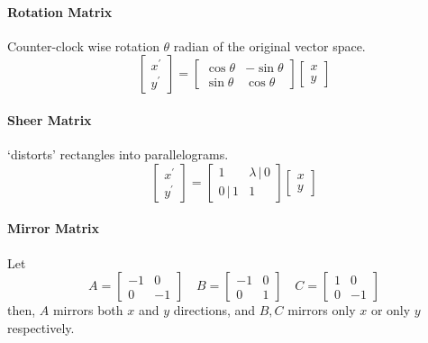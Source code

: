 \documentclass[11pt]{article}
\begin{document}
\paragraph{Rotation Matrix} Counter-clock wise rotation $\theta$ radian of the original vector space. 
\begin{equation}
	\left[\begin{array}{l}
		x^{\prime} \\
		y^{\prime}
		\end{array}\right]=\left[\begin{array}{ll}
		\cos \theta & -\sin\theta \\
		\sin\theta & \cos\theta
		\end{array}\right]\left[\begin{array}{l}
		x \\
		y
	\end{array}\right]
\end{equation}

\paragraph{Sheer Matrix} `distorts' rectangles into parallelograms. 
\begin{equation}
	\left[\begin{array}{l}
		x^{\prime} \\
		y^{\prime}
		\end{array}\right]=\left[\begin{array}{ll}
		1 & \lambda\, | \,0 \\
		0\, | \,1 & 1
		\end{array}\right]\left[\begin{array}{l}
		x \\
		y
	\end{array}\right]
\end{equation}

\paragraph{Mirror Matrix} Let
\begin{equation}
	A = \begin{bmatrix}
		-1 & 0 \\ 0 & -1
	\end{bmatrix} \quad B = \begin{bmatrix}
		-1 & 0 \\ 0 & 1 
	\end{bmatrix} \quad C = \begin{bmatrix}
		1 & 0 \\
		0 & -1
	\end{bmatrix}
\end{equation}
then, $A$ mirrors both $x$ and $y$ directions, and $B, C$ mirrors only $x$ or only $y$ respectively. 
\end{document}

